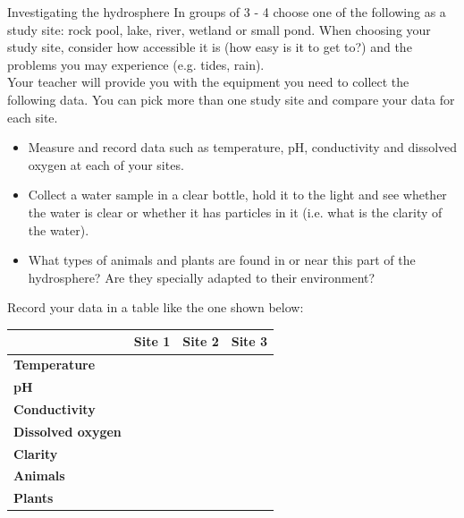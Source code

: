 \label{m38138*secfhsst!!!underscore!!!id86}
\begin{Investigation}{Investigating the hydrosphere}
            \nopagebreak 
In groups of 3 - 4 choose one of the following as a study site: rock pool, lake, river, wetland or small pond. When choosing your study site, consider how accessible it is (how easy is it to get to?) and the problems you may experience (e.g. tides, rain).\\
Your teacher will provide you with the equipment you need to collect the following data. You can pick more than one study site and compare your data for each site.
\begin{itemize}
\item Measure and record data such as temperature, pH, conductivity and dissolved oxygen at each of your sites.
\item Collect a water sample in a clear bottle, hold it to the light and see whether the water is clear or whether it has particles in it (i.e. what is the clarity of the water). 
\item What types of animals and plants are found in or near this part of the hydrosphere? Are they specially adapted to their environment?
\end{itemize}

Record your data in a table like the one shown below:
          \begin{table}[H]
        \begin{center}
      \label{m38138*id334712}
    \noindent
      \begin{tabular}{|l|l|l|l|}\hline
         &
        \textbf{Site 1} &
        \textbf{Site 2} &
        \textbf{Site 3} \\ \hline
        \textbf{Temperature} &
         &
         &
       \\ \hline
        \textbf{pH} &
         &
         &
      \\ \hline
        \textbf{Conductivity} &
         &
         &
       \\ \hline
        \textbf{Dissolved oxygen} &
         &
         &
        \\ \hline
\textbf{Clarity } & & & \\ \hline
        \textbf{Animals} &
         &
         &
        \\ \hline
        \textbf{Plants} &
         &
         &
        \\ \hline
    \end{tabular}
      \end{center}
\end{table}


\end{Investigation}
